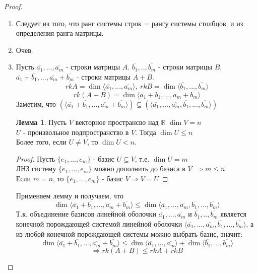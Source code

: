 \documentclass[a4paper, 12pt]{article}
\newcommand{\R}{\mathbb R}
\newcommand\tab[1][.5cm]{\hspace*{#1}}
\theoremstyle{definition}
\newtheorem*{lemma}{Лемма}
\begin{document}
  \begin{proof} \tab
    \begin{enumerate} 
      \item Следует из того, что ранг системы строк = рангу системы столбцов, и из определения ранга матрицы.
      \item Очев. 
      \item Пусть $\overline{a_1},...,\overline{a_m}$ - строки матрицы $A$. $\overline{b_1},..,\overline{b_m}$  - строки матрицы $B$. \\
      $\overline{a_1} + \overline{b_1} ,..., \overline{a_m} + \overline{b_m}$ - строки матрицы $A+B$. 
      $$rkA = \dim \langle \overline{a_1},...,\overline{a_m} \rangle, \ rkB = \dim \langle \overline{b_1},...,\overline{b_m} \rangle$$   
      $$rk(A+B) = \dim \langle \overline{a_1} + \overline{b_1} ,..., \overline{a_m} + \overline{b_m} \rangle$$ 
      Заметим, что $(\langle \overline{a_1} + \overline{b_1} ,..., \overline{a_m} + \overline{b_m} \rangle) \subseteq (\langle \overline{a_1},...,\overline{a_m}, \overline{b_1},...,\overline{b_m} \rangle)$   
      \begin{lemma}
        Пусть $V$ векторное пространсво над $\R$ $\dim V = n$  \\
        $U$ -  произвольное подпространство в $V$. Тогда $\dim U \leq n$ \\
        Более того, если $U \neq V$, то $\dim U<n$.
      \end{lemma} 
      \begin{proof} 
        Пусть $\{e_1,...,e_m\}$ - базис $U \subseteq V$, т.е. $\dim U = m$ \\
        ЛНЗ систему $\{e_1,...,e_m\}$ можно дополнить до базиса в $V$ $\Longrightarrow m\leq n$  \\
        Если $m = n$, то $\{e_1,...,e_m\}$ - базис $V \Longrightarrow V=U$
      \end{proof} 
      Применяем лемму и получаем, что 
      $$\dim\langle \overline{a_1} + \overline{b_1} ,..., \overline{a_m} + \overline{b_m} \rangle \leq \dim\langle \overline{a_1},...,\overline{a_m}, \overline{b_1},...,\overline{b_m} \rangle$$ 
      Т.к. объединение базисов линейной оболочки $\overline{a_1},...,\overline{a_m}$ и $\overline{b_1},..,\overline{b_m}$ является конечной порождающей системой линейной оболочки $\langle \overline{a_1},...,\overline{a_m}, \overline{b_1},...,\overline{b_m} \rangle$, а из любой конечной порождающей системы можно выбрать базис, значит: $$\dim\langle \overline{a_1} + \overline{b_1} ,..., \overline{a_m} + \overline{b_m} \rangle \leq \dim\langle \overline{a_1},...,\overline{a_m} \rangle + \dim\langle \overline{b_1},...,\overline{b_m} \rangle$$ $$\Longrightarrow  rk(A+B) \leq rkA + rkB$$

\end{enumerate}
\end{proof}
\end{document}

